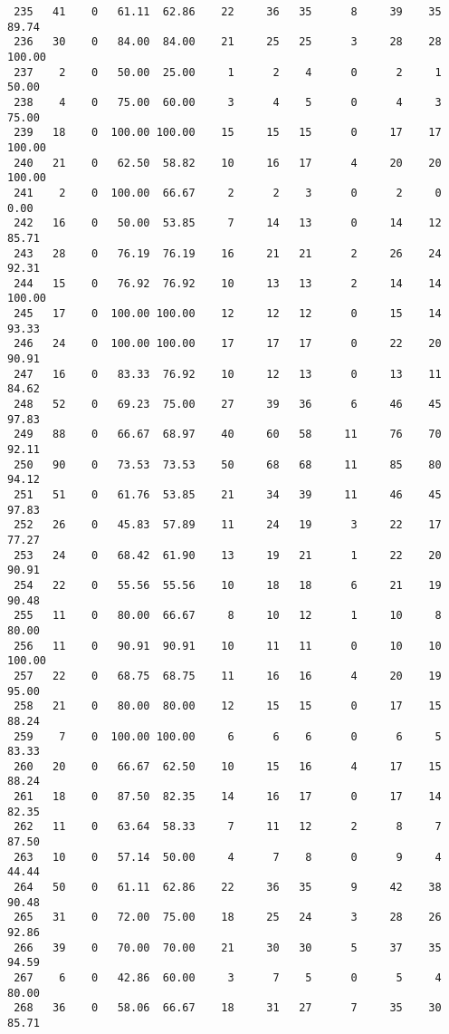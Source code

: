 \begin{verbatim}
 235   41    0   61.11  62.86    22     36   35      8     39    35    89.74
 236   30    0   84.00  84.00    21     25   25      3     28    28   100.00
 237    2    0   50.00  25.00     1      2    4      0      2     1    50.00
 238    4    0   75.00  60.00     3      4    5      0      4     3    75.00
 239   18    0  100.00 100.00    15     15   15      0     17    17   100.00
 240   21    0   62.50  58.82    10     16   17      4     20    20   100.00
 241    2    0  100.00  66.67     2      2    3      0      2     0     0.00
 242   16    0   50.00  53.85     7     14   13      0     14    12    85.71
 243   28    0   76.19  76.19    16     21   21      2     26    24    92.31
 244   15    0   76.92  76.92    10     13   13      2     14    14   100.00
 245   17    0  100.00 100.00    12     12   12      0     15    14    93.33
 246   24    0  100.00 100.00    17     17   17      0     22    20    90.91
 247   16    0   83.33  76.92    10     12   13      0     13    11    84.62
 248   52    0   69.23  75.00    27     39   36      6     46    45    97.83
 249   88    0   66.67  68.97    40     60   58     11     76    70    92.11
 250   90    0   73.53  73.53    50     68   68     11     85    80    94.12
 251   51    0   61.76  53.85    21     34   39     11     46    45    97.83
 252   26    0   45.83  57.89    11     24   19      3     22    17    77.27
 253   24    0   68.42  61.90    13     19   21      1     22    20    90.91
 254   22    0   55.56  55.56    10     18   18      6     21    19    90.48
 255   11    0   80.00  66.67     8     10   12      1     10     8    80.00
 256   11    0   90.91  90.91    10     11   11      0     10    10   100.00
 257   22    0   68.75  68.75    11     16   16      4     20    19    95.00
 258   21    0   80.00  80.00    12     15   15      0     17    15    88.24
 259    7    0  100.00 100.00     6      6    6      0      6     5    83.33
 260   20    0   66.67  62.50    10     15   16      4     17    15    88.24
 261   18    0   87.50  82.35    14     16   17      0     17    14    82.35
 262   11    0   63.64  58.33     7     11   12      2      8     7    87.50
 263   10    0   57.14  50.00     4      7    8      0      9     4    44.44
 264   50    0   61.11  62.86    22     36   35      9     42    38    90.48
 265   31    0   72.00  75.00    18     25   24      3     28    26    92.86
 266   39    0   70.00  70.00    21     30   30      5     37    35    94.59
 267    6    0   42.86  60.00     3      7    5      0      5     4    80.00
 268   36    0   58.06  66.67    18     31   27      7     35    30    85.71

\end{verbatim}
